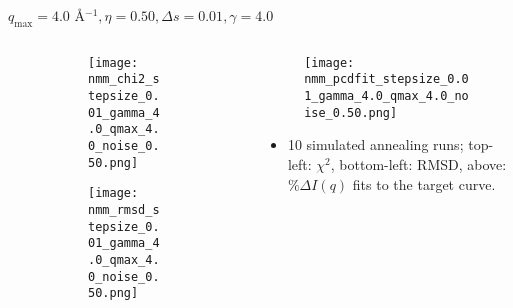 \documentclass{beamer}
\begin{document}
\begin{frame}{$ q_{\textrm{max}}=4.0 $ \AA $^{-1}, \eta=0.50, \Delta s=0.01, \gamma=4.0$}
	\begin{columns}
		\begin{column}{.5\textwidth}
			\begin{figure}[H]
			\centering
			\begin{subfigure}[b]{\textwidth}
				\centering
				\texttt{[image: nmm\_chi2\_stepsize\_0.01\_gamma\_4.0\_qmax\_4.0\_noise\_0.50.png]}
				\label{fig:}
			\end{subfigure}
			\begin{subfigure}[b]{\textwidth}
				\centering
				\texttt{[image: nmm\_rmsd\_stepsize\_0.01\_gamma\_4.0\_qmax\_4.0\_noise\_0.50.png]}
				\label{fig:}
			\end{subfigure}
			\end{figure}
		\end{column}
		\begin{column}{.5\textwidth}
			\begin{figure}[H]
				\centering
				\texttt{[image: nmm\_pcdfit\_stepsize\_0.01\_gamma\_4.0\_qmax\_4.0\_noise\_0.50.png]}
				\label{fig:}
			\end{figure}
			\begin{itemize}
				\item 10 simulated annealing runs; top-left: $\chi^2$, bottom-left: RMSD, above: $\%\Delta I(q)$ fits to the target curve.
			\end{itemize}
		\end{column}
	\end{columns}
\end{frame}
 
\end{document}
